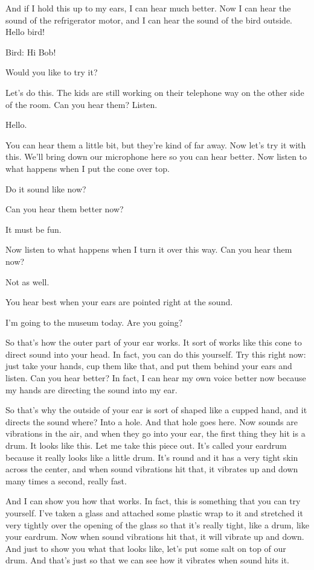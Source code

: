 And if I hold this up to my ears, I can hear much better. Now I can hear the sound of the refrigerator motor, and I can hear the sound of the bird outside. Hello bird!

Bird: Hi Bob!

Would you like to try it?

Let's do this. The kids are still working on their telephone way on the other side of the room. Can you hear them? Listen.

Hello.

You can hear them a little bit, but they're kind of far away. Now let's try it with this. We'll bring down our microphone here so you can hear better. Now listen to what happens when I put the cone over top.

Do it sound like now?

Can you hear them better now?

It must be fun.

Now listen to what happens when I turn it over this way. Can you hear them now?

Not as well.

You hear best when your ears are pointed right at the sound.

I'm going to the museum today. Are you going?

So that's how the outer part of your ear works. It sort of works like this cone to direct sound into your head. In fact, you can do this yourself. Try this right now: just take your hands, cup them like that, and put them behind your ears and listen. Can you hear better? In fact, I can hear my own voice better now because my hands are directing the sound into my ear.

So that's why the outside of your ear is sort of shaped like a cupped hand, and it directs the sound where? Into a hole. And that hole goes here. Now sounds are vibrations in the air, and when they go into your ear, the first thing they hit is a drum. It looks like this. Let me take this piece out. It's called your eardrum because it really looks like a little drum. It's round and it has a very tight skin across the center, and when sound vibrations hit that, it vibrates up and down many times a second, really fast.

And I can show you how that works. In fact, this is something that you can try yourself. I've taken a glass and attached some plastic wrap to it and stretched it very tightly over the opening of the glass so that it's really tight, like a drum, like your eardrum. Now when sound vibrations hit that, it will vibrate up and down. And just to show you what that looks like, let's put some salt on top of our drum. And that's just so that we can see how it vibrates when sound hits it.


